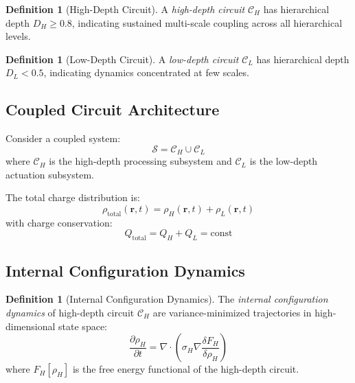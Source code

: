 \documentclass[12pt,a4paper]{article}
\theoremstyle{plain}
\theoremstyle{definition}
\newtheorem{definition}[theorem]{Definition}
\theoremstyle{remark}
\begin{document}
\begin{definition}[High-Depth Circuit]
\label{def:high_depth}
A \emph{high-depth circuit} $\mathcal{C}_H$ has hierarchical depth $D_H \geq 0.8$, indicating sustained multi-scale coupling across all hierarchical levels.
\end{definition}

\begin{definition}[Low-Depth Circuit]
\label{def:low_depth}
A \emph{low-depth circuit} $\mathcal{C}_L$ has hierarchical depth $D_L < 0.5$, indicating dynamics concentrated at few scales.
\end{definition}

\subsection{Coupled Circuit Architecture}

Consider a coupled system:
\begin{equation}
\mathcal{S} = \mathcal{C}_H \cup \mathcal{C}_L
\end{equation}
where $\mathcal{C}_H$ is the high-depth processing subsystem and $\mathcal{C}_L$ is the low-depth actuation subsystem.

The total charge distribution is:
\begin{equation}
\rho_{\text{total}}(\mathbf{r}, t) = \rho_H(\mathbf{r}, t) + \rho_L(\mathbf{r}, t)
\end{equation}
with charge conservation:
\begin{equation}
Q_{\text{total}} = Q_H + Q_L = \text{const}
\end{equation}

\subsection{Internal Configuration Dynamics}

\begin{definition}[Internal Configuration Dynamics]
\label{def:internal_dynamics}
The \emph{internal configuration dynamics} of high-depth circuit $\mathcal{C}_H$ are variance-minimized trajectories in high-dimensional state space:
\begin{equation}
\frac{\partial \rho_H}{\partial t} = \nabla \cdot \left( \sigma_H \nabla \frac{\delta F_H}{\delta \rho_H} \right)
\end{equation}
where $F_H[\rho_H]$ is the free energy functional of the high-depth circuit.
\end{definition}
\end{document}
